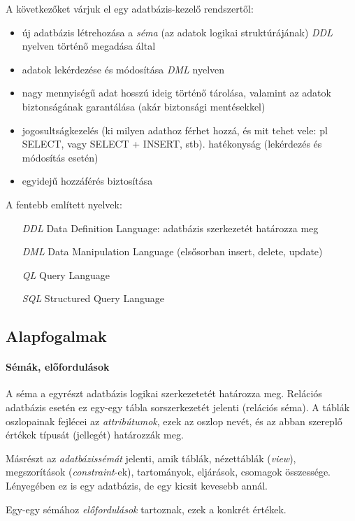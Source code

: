 \documentclass[fleqn,10pt,a4paper]{article}
\theoremstyle{magyar}
\begin{document}
  A következőket várjuk el egy adatbázis-kezelő rendszertől:
  \begin{itemize}
  \item új adatbázis létrehozása a \emph{séma} (az adatok logikai struktúrájának) \emph{DDL} nyelven történő megadása
    által
  \item adatok lekérdezése és módosítása \emph{DML} nyelven
  \item nagy mennyiségű adat  hosszú ideig történő tárolása, valamint az adatok biztonságának garantálása (akár
    biztonsági mentésekkel)
  \item jogosultságkezelés (ki milyen adathoz férhet hozzá, és mit tehet vele: pl SELECT, vagy SELECT + INSERT, stb).
    hatékonyság (lekérdezés és módosítás esetén)
  \item egyidejű hozzáférés biztosítása
  \end{itemize}
  
  A fentebb említett nyelvek:
  \begin{itemize}
  \item[\emph{DDL}] Data Definition Language: adatbázis szerkezetét határozza meg
  \item[\emph{DML}] Data Manipulation Language (elsősorban insert, delete, update)
  \item[\emph{QL}] Query Language
  \item[\emph{SQL}] Structured Query Language
  \end{itemize} 
  
  \subsection{Alapfogalmak}
  \paragraph{Sémák, előfordulások}
  A séma a egyrészt  adatbázis logikai szerkezetetét határozza meg. Relációs adatbázis esetén ez egy-egy tábla sorszerkezetét
  jelenti (relációs séma). A táblák oszlopainak fejlécei az \emph{attribútumok}, ezek az oszlop nevét, és az abban
  szereplő értékek típusát (jellegét) határozzák meg.
  
  Másrészt az \emph{adatbázissémát} jelenti, amik táblák, nézettáblák (\emph{view}), megszorítások
  (\emph{constraint}-ek), tartományok, eljárások, csomagok összessége. Lényegében ez is egy adatbázis, de egy kicsit
  kevesebb annál.

  Egy-egy sémához \emph{előfordulások} tartoznak, ezek a konkrét értékek.
\end{document}
